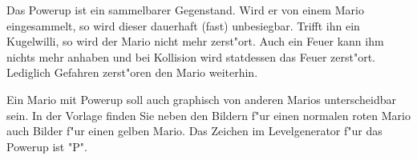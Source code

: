 Das Powerup ist ein sammelbarer Gegenstand. Wird er von einem Mario eingesammelt, so wird dieser dauerhaft (fast) unbesiegbar. Trifft ihn ein Kugelwilli, so wird der Mario nicht mehr zerst"ort. 
Auch ein Feuer kann ihm nichts mehr anhaben und bei Kollision wird statdessen das Feuer zerst"ort.
Lediglich Gefahren zerst"oren den Mario weiterhin.

Ein Mario mit Powerup soll auch graphisch von anderen Marios unterscheidbar sein. In der Vorlage finden Sie neben den Bildern f"ur einen normalen roten Mario auch Bilder f"ur einen gelben Mario.
Das Zeichen im Levelgenerator f"ur das Powerup ist "P".